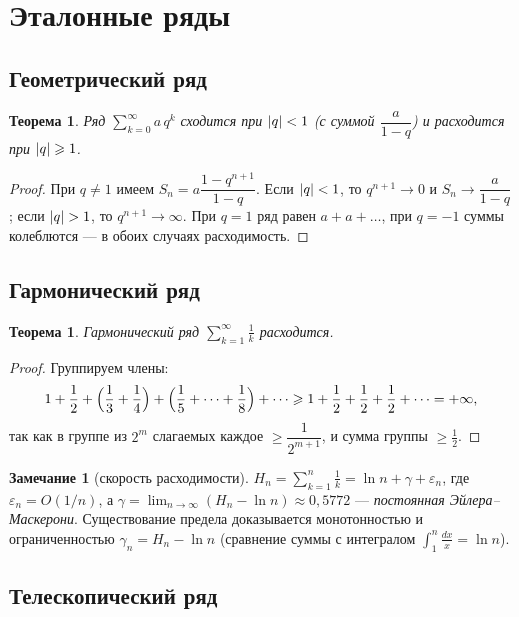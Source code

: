 \documentclass[11pt,a4paper]{article}
\theoremstyle{definition}
\newtheorem{remark}[definition]{Замечание}
\theoremstyle{plain}
\newtheorem{theorem}[definition]{Теорема}
\newcommand{\eps}{\varepsilon}
\renewcommand{\ge}{\geqslant}
\DeclarePairedDelimiter{\abs}{\lvert}{\rvert}
\begin{document}
\section{Эталонные ряды}

\subsection{Геометрический ряд}

\begin{theorem}
Ряд $\displaystyle\sum_{k=0}^{\infty}a\,q^k$ сходится при $\abs q<1$ (с суммой
$\dfrac{a}{1-q}$) и расходится при $\abs q\ge1$.
\end{theorem}

\begin{proof}
При $q\ne1$ имеем $S_n=a\dfrac{1-q^{n+1}}{1-q}$. Если $\abs q<1$, то $q^{n+1}\to0$ и
$S_n\to\dfrac{a}{1-q}$; если $\abs q>1$, то $q^{n+1}\to\infty$. При $q=1$ ряд равен $a+a+\dots$, при
$q=-1$ суммы колеблются — в обоих случаях расходимость.
\end{proof}

\subsection{Гармонический ряд}

\begin{theorem}
Гармонический ряд $\displaystyle\sum_{k=1}^{\infty}\frac1k$ расходится.
\end{theorem}

\begin{proof}
Группируем члены:
\[
  1+\frac12+\Bigl(\frac13+\frac14\Bigr)+\Bigl(\frac15+\dots+\frac18\Bigr)+\dots
   \ge 1+\frac12+\frac12+\frac12+\dots=+\infty,
\]
так как в группе из $2^{m}$ слагаемых каждое $\ge\dfrac1{2^{m+1}}$, и сумма группы $\ge\tfrac12$.
\end{proof}

\begin{remark}[скорость расходимости]
$\displaystyle H_n=\sum_{k=1}^n\frac1k=\ln n+\gamma+\eps_n$, где $\eps_n=O(1/n)$, а
$\gamma=\displaystyle\lim_{n\to\infty}(H_n-\ln n)\approx0{,}5772$ — \emph{постоянная
Эйлера–Маскерони}. Существование предела доказывается монотонностью и ограниченностью
$\gamma_n=H_n-\ln n$ (сравнение суммы с интегралом $\int_1^n\frac{dx}{x}=\ln n$).
\end{remark}

\subsection{Телескопический ряд}
\end{document}
